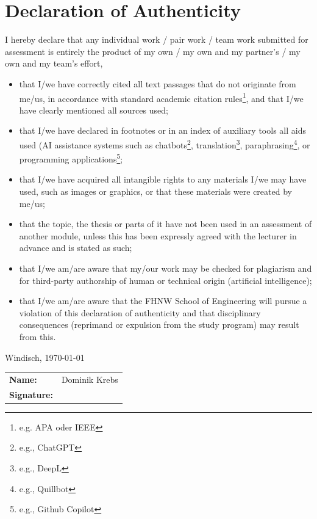 \section*{Declaration of Authenticity}


I hereby declare that any individual work / pair work / team work submitted for assessment is entirely the product of my own / my own and my partner’s / my own and my team’s effort,
\begin{itemize} 
\item that I/we have correctly cited all text passages that do not originate from me/us, in accordance with standard academic citation rules\footnote{e.g. APA oder IEEE}, and that I/we have clearly mentioned all sources used; 
\item that I/we have declared in footnotes or in an index of auxiliary tools all aids used (AI assistance systems such as chatbots\footnote{e.g., ChatGPT}, translation\footnote{e.g., DeepL}, paraphrasing\footnote{e.g., Quillbot}, or programming applications\footnote{e.g., Github Copilot};
\item that I/we have acquired all intangible rights to any materials I/we may have used, such as images or graphics, or that these materials were created by me/us; 
\item that the topic, the thesis or parts of it have not been used in an assessment of another module, unless this has been expressly agreed with the lecturer in advance and is stated as such;
\item that I/we am/are aware that my/our work may be checked for plagiarism and for third-party authorship of human or technical origin (artificial intelligence); 
\item that I/we am/are aware that the FHNW School of Engineering will pursue a violation of this declaration of authenticity and that disciplinary consequences (reprimand or expulsion from the study program) may result from this.
\end{itemize}

\vspace*{4ex}

Windisch, \today

\vspace*{4ex}

{\renewcommand{\arraystretch}{2}
\begin{tabular}{@{}>{\bf}ll}
Name: & Dominik Krebs\\
Signature: & \\[6ex]
\end{tabular}
}
